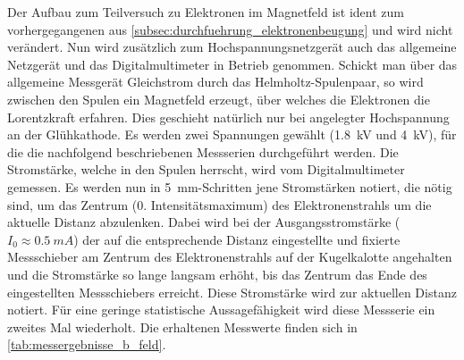 \documentclass[ngerman]{scrartcl}
\begin{document}
Der Aufbau zum Teilversuch zu Elektronen im Magnetfeld ist ident zum vorhergegangenen aus \autoref{subsec:durchfuehrung_elektronenbeugung} und wird nicht verändert. Nun wird zusätzlich zum Hochspannungsnetzgerät auch das allgemeine Netzgerät und das Digitalmultimeter in Betrieb genommen. Schickt man über das allgemeine Messgerät Gleichstrom
durch das Helmholtz-Spulenpaar, so wird zwischen den Spulen ein Magnetfeld erzeugt, über welches die Elektronen die Lorentzkraft erfahren. Dies geschieht natürlich nur bei angelegter Hochspannung an der Glühkathode. Es werden zwei Spannungen gewählt (\SI{1.8}{kV} und \SI{4}{kV}), für die die nachfolgend beschriebenen Messserien durchgeführt werden. Die Stromstärke, welche in den Spulen herrscht, wird vom Digitalmultimeter gemessen. Es werden nun in \SI{5}{mm}-Schritten jene Stromstärken notiert, die nötig sind, um das Zentrum (0. Intensitätsmaximum) des Elektronenstrahls um die aktuelle Distanz abzulenken. Dabei wird bei der Ausgangsstromstärke ($I_0 \approx \SI{0.5}{mA}$) der auf die entsprechende Distanz eingestellte und fixierte Messschieber am Zentrum des Elektronenstrahls auf der Kugelkalotte angehalten und die Stromstärke so lange langsam erhöht, bis das Zentrum das Ende des eingestellten Messschiebers erreicht. Diese Stromstärke wird zur aktuellen Distanz notiert. Für eine geringe statistische Aussagefähigkeit wird diese Messserie ein zweites Mal wiederholt. Die erhaltenen Messwerte finden sich in \autoref{tab:messergebnisse_b_feld}.
%
\end{document}
